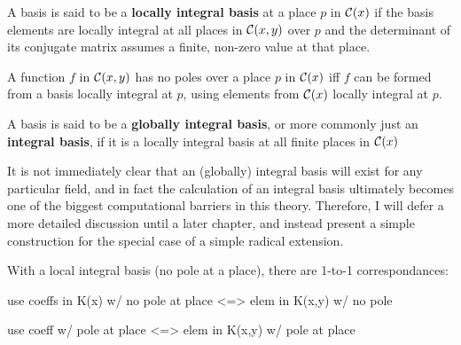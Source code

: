 A basis is said to be a {\bf locally integral basis} at a place $p$ in
${\cal C}(x)$ if the basis elements are locally integral at all places
in ${\cal C}(x,y)$ over $p$ and the determinant of its conjugate
matrix assumes a finite, non-zero value at that place.

\enddefinition

\theorem

A function $f$ in ${\cal C}(x,y)$ has no poles over a place $p$ in
${\cal C}(x)$ iff $f$ can be formed from a basis locally integral at
$p$, using elements from ${\cal C}(x)$ locally integral at $p$.

\endtheorem


A basis is said to be a {\bf globally integral basis}, or more commonly
just an {\bf integral basis}, if it is a locally integral basis at
all finite places in ${\cal C}(x)$

\enddefinition

It is not immediately clear that an (globally) integral basis will
exist for any particular field, and in fact the calculation of an
integral basis ultimately becomes one of the biggest computational
barriers in this theory.  Therefore, I will defer a more detailed
discussion until a later chapter, and instead present a simple
construction for the special case of a simple radical extension.

With a local integral basis (no pole at a place), there are 1-to-1
correspondances:

	use coeffs in K(x) w/ no pole at place <=> elem in K(x,y) w/ no pole

	use coeff w/ pole at place <=> elem in K(x,y) w/ pole at place
